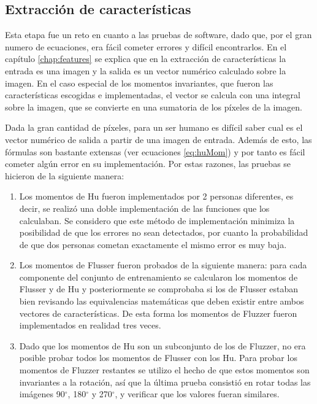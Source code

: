 \documentclass[a4paper, 11pt, oneside]{report}
\begin{document}
\subsection{Extracción de características}

Esta etapa fue un reto en cuanto a las pruebas de software, dado que, por el gran numero de ecuaciones, era fácil cometer errores y difícil encontrarlos. En el capítulo \ref{chap:features} se explica que en la extracción de características la entrada es una imagen y la salida es un vector numérico calculado sobre la imagen. En el caso especial de los momentos invariantes, que fueron las características escogidas e implementadas, el vector se calcula con una integral sobre la imagen, que se convierte en una sumatoria de los píxeles de la imagen.

Dada la gran cantidad de píxeles, para un ser humano es difícil saber cual es el vector numérico de salida a partir de una imagen de entrada. Además de esto, las fórmulas son bastante extensas (ver ecuaciones \ref{eq:huMom}) y por tanto es fácil cometer algún error en su implementación. Por estas razones, las pruebas se hicieron de la siguiente manera:

	\begin{enumerate}

	\item Los momentos de Hu fueron implementados por 2 personas diferentes, es decir, se realizó una doble implementación de las funciones que los calculaban. Se considero que este método de implementación minimiza la posibilidad de que los errores no sean detectados, por cuanto la probabilidad de que dos personas cometan exactamente el mismo error es muy baja.
	
	\item Los momentos de Flusser fueron probados de la siguiente manera: para cada componente del conjunto de entrenamiento se calcularon los momentos de Flusser y de Hu y posteriormente se comprobaba si los de Flusser estaban bien revisando las equivalencias matemáticas que deben existir entre ambos vectores de características\cite{FLuzzer}. De esta forma los momentos de Fluzzer fueron implementados en realidad tres veces.
	
	\item Dado que los momentos de Hu son un subconjunto de los de Fluzzer, no era posible probar todos los momentos de Flusser con los Hu. Para probar los momentos de Fluzzer restantes se utilizo el hecho de que estos momentos son invariantes a la rotación, así que la última prueba consistió en rotar todas las imágenes 90$^\circ$, 180$^\circ$ y 270$^\circ$, y verificar que los valores fueran similares.
	
	\end{enumerate}
\end{document}
